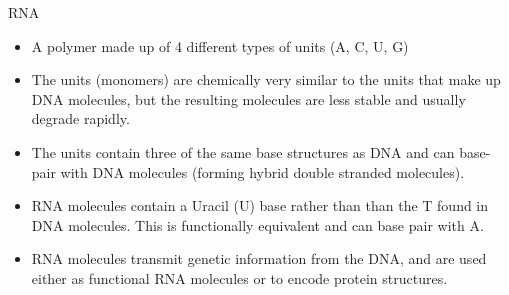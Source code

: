 \documentclass[pdf]{beamer}
\newcommand\subHeading[1]{
  \par\bigskip {\Large\bfseries#1}\par\smallskip
}
\begin{document}
\begin{frame}{RNA}
  \subHeading{What is RNA?}
  \begin{itemize}
    \item A polymer made up of 4 different types of units (A, C, U, G)
    \item The units (monomers) are chemically very similar to the units
      that make up DNA molecules, but the resulting molecules are less
      stable and usually degrade rapidly.
    \item The units contain three of the same base structures as DNA and
      can base-pair with DNA molecules (forming hybrid double stranded molecules).
    \item RNA molecules contain a Uracil (U) base rather than than the T found in
      DNA molecules. This is functionally equivalent and can base pair with A.
    \item RNA molecules transmit genetic information from the DNA, and are used
      either as functional RNA molecules or to encode protein structures.
  \end{itemize}
\end{frame}
\end{document}
